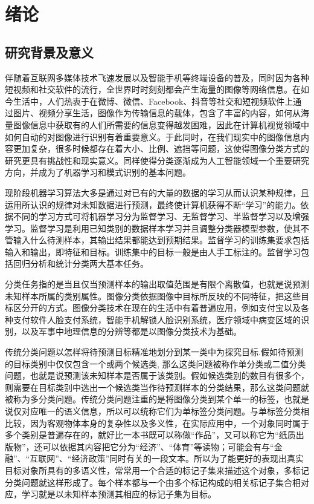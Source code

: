 \chapter{绪论}

\section{研究背景及意义}

伴随着互联网多媒体技术飞速发展以及智能手机等终端设备的普及，同时因为各种短视频和社交软件的流行，全世界时时刻刻都会产生海量的图像等网络信息。在如今生活中，人们热衷于在微博、微信、Facebook、抖音等社交和短视频软件上通过图片、视频分享生活，图像作为传输信息的载体，包含了丰富的内容，如何从海量图像信息中获取有的人们所需要的信息变得越发困难，因此在计算机视觉领域中如何自动的对图像进行识别有着重要意义。于此同时，在我们现实中的图像信息内容更加复杂，很多时候都存在着大小、比例、遮挡等问题，这使得图像分类方式的研究更具有挑战性和现实意义。同样使得分类逐渐成为人工智能领域一个重要研究方向，并成为了机器学习和模式识别的基本问题。

现阶段机器学习算法大多是通过对已有的大量的数据的学习从而认识某种规律，且运用所认识的规律对未知数据进行预测，最终使计算机获得不断“学习”的能力。依据不同的学习方式可将机器学习分为监督学习、无监督学习、半监督学习以及增强学习。监督学习是利用已知类别的数据样本学习并且调整分类器模型参数，使其不管输入什么待测样本，其输出结果都能达到预期结果。监督学习的训练集要求包括输入和输出，即特征和目标。训练集中的目标一般是由人手工标注的。监督学习包括回归分析和统计分类两大基本任务。

分类任务指的是当且仅当预测样本的输出取值范围是有限个离散值，也就是说预测未知样本所属的类别属性。图像分类依据图像中目标所反映的不同特征，把这些目标区分开的方式。图像分类技术在现在的生活中有着普遍应用，例如支付宝以及各种支付软件人脸支付系统，智能手机解锁人脸识别系统，医疗领域中病变区域的识别，以及军事中地理信息的分辨等都是以图像分类技术为基础。

传统分类问题以怎样将待预测目标精准地划分到某一类中为探究目标.假如待预测的目标类别中仅仅包含一个或两个候选类, 那么这类问题被称作单分类或二值分类问题，也就是说预测该未知样本是否属于该类别。假如候选类别的数目有很多个，则需要在目标类别中选出一个候选类当作待预测样本的分类结果，那么这类问题就被称为多分类问题。传统分类问题注重的是将图像分类到某个单一的标签，也就是说仅对应唯一的语义信息，所以可以统称它们为单标签分类问题。与单标签分类相比较，因为客观物体本身的复杂性以及多义性，在实际应用中，一个对象同时属于多个类别是普遍存在的，就好比一本书既可以称做“作品”，又可以称它为“纸质出版物”，还可以依据其内容把它分为“经济”、“体育”等读物；可能会有与“金融”、“互联网”、“经济政策”同时有关的一段文本。所以为了能更好的表现出真实目标对象所具有的多语义性，常常用一个合适的标记子集来描述这个对象，多标记分类问题就这样形成了。每个样本都与一个由多个标记构成的相关标记子集合相对应，学习就是以未知样本预测其相应的标记子集为目标。

